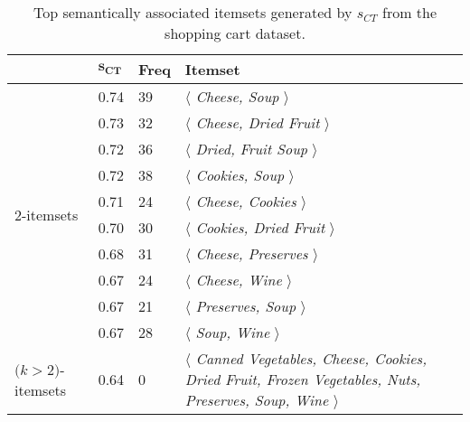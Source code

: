 \begin{table}
\begin{center}
\begin{tabular}{l|l | l | l }
  \hline
&$\mathbf{s_{CT}}$       &\textbf{Freq}&   \textbf{Itemset}\\
  \hline\hline
\multirow{10}{*}{2-itemsets}& 0.74	&	39	&$\langle$\emph{	Cheese,	Soup	}$\rangle$\\
&0.73	&	32	&$\langle$\emph{	Cheese,	Dried Fruit	}$\rangle$\\
&0.72	&	36	&$\langle$\emph{	Dried, Fruit	Soup	}$\rangle$\\
&0.72	&	38	&$\langle$\emph{	Cookies,	Soup	}$\rangle$\\
&0.71	&	24	&$\langle$\emph{	Cheese,	Cookies	}$\rangle$\\
&0.70	&	30	&$\langle$\emph{	Cookies,	Dried Fruit	}$\rangle$\\
&0.68	&	31	&$\langle$\emph{	Cheese,	Preserves	}$\rangle$\\
&0.67   &	24	&$\langle$\emph{	Cheese,	Wine	}$\rangle$\\
&0.67	&	21	&$\langle$\emph{	Preserves,	Soup	}$\rangle$\\
&0.67	&	28	&$\langle$\emph{	Soup,	Wine	}$\rangle$\\
\hline
\parbox{1cm}{$(k$$>$2$)$-itemsets}&0.64 &	0	&\parbox{6cm}{$\langle$\emph{ Canned Vegetables, Cheese, Cookies, Dried Fruit, Frozen Vegetables, Nuts, Preserves, Soup, Wine }$\rangle$}\\
  \hline
\end{tabular}
\end{center}
\caption{\label{tbl:foodmart_ct} Top semantically associated itemsets generated by $s_{CT}$ from the shopping cart dataset.}
\end{table}


